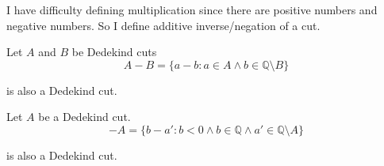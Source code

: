 \par I have difficulty defining multiplication since there are positive numbers and negative numbers. So I define additive inverse/negation of a cut.

\begin{theorem}[Subtraction]
    \par Let $A$ and $B$ be Dedekind cuts
    \[
       A - B = \{ a - b: a\in A\land b\in\mathbb{Q}\setminus B \}
    \]
    \par is also a Dedekind cut.
\end{theorem}

\begin{theorem}
    \par Let $A$ be a Dedekind cut.
    \[
        -A = \{ b - a' : b < 0 \wedge b\in\mathbb{Q} \wedge a'\in\mathbb{Q}\setminus A \}
    \]
    \par is also a Dedekind cut.
\end{theorem}

